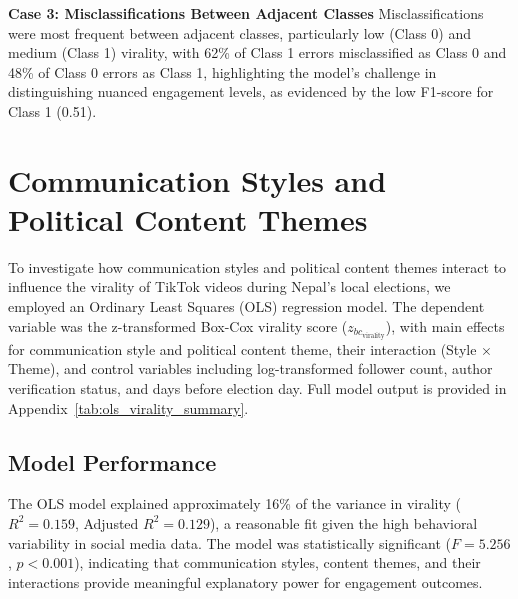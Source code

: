 \documentclass[12pt,a4paper]{report}
\begin{document}
\textbf{Case 3: Misclassifications Between Adjacent Classes}
Misclassifications were most frequent between adjacent classes, particularly low (Class 0) and medium (Class 1) virality, with 62\% of Class 1 errors misclassified as Class 0 and 48\% of Class 0 errors as Class 1, highlighting the model’s challenge in distinguishing nuanced engagement levels, as evidenced by the low F1-score for Class 1 (0.51).
\newpage
\section{Communication Styles and Political Content Themes}
To investigate how communication styles and political content themes interact to influence the virality of TikTok videos during Nepal’s local elections, we employed an Ordinary Least Squares (OLS) regression model. The dependent variable was the z-transformed Box-Cox virality score (\( z_{bc_{\text{virality}}} \)), with main effects for communication style and political content theme, their interaction (Style \(\times\) Theme), and control variables including log-transformed follower count, author verification status, and days before election day. Full model output is provided in Appendix~\ref{tab:ols_virality_summary}.

\subsection{Model Performance}
The OLS model explained approximately 16\% of the variance in virality (\( R^2 = 0.159 \), Adjusted \( R^2 = 0.129 \)), a reasonable fit given the high behavioral variability in social media data. The model was statistically significant (\( F = 5.256 \), \( p < 0.001 \)), indicating that communication styles, content themes, and their interactions provide meaningful explanatory power for engagement outcomes.
\end{document}
